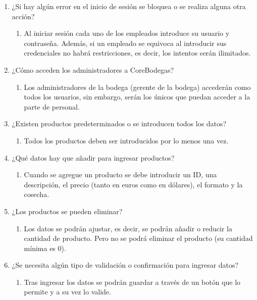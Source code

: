 \begin{enumerate}
    \item ¿Si hay algún error en el inicio de sesión se bloquea o se realiza alguna otra acción?

    \begin{enumerate}
        \item Al iniciar sesión cada uno de los empleados introduce su usuario y
contraseña. Además, si un empleado se equivoca al introducir sus
credenciales no habrá restricciones, es decir, los intentos serán ilimitados.
    \end{enumerate}

    \item ¿Cómo acceden los administradores a CoreBodegas?
    \begin{enumerate}
        \item Los administradores de la bodega (gerente de la bodega) accederán como todos los usuarios, sin embargo, serán los únicos que puedan acceder a la parte de personal.
    \end{enumerate}

    \item ¿Existen productos predeterminados o se introducen todos los datos?
    \begin{enumerate}
        \item Todos los productos deben ser introducidos por lo menos una vez.
    \end{enumerate}

    \item ¿Qué datos hay que añadir para ingresar productos?
    \begin{enumerate}
        \item Cuando se agregue un producto se debe introducir un ID, una descripción, el precio (tanto en euros como en dólares), el formato y la cosecha.
    \end{enumerate}

    \item ¿Los productos se pueden eliminar?
    \begin{enumerate}
        \item Los datos se podrán ajustar, es decir, se podrán añadir o reducir la cantidad de producto. Pero no se podrá eliminar el producto (su cantidad mínima es 0).
    \end{enumerate}

    \item ¿Se necesita algún tipo de validación o confirmación para ingresar datos?
    \begin{enumerate}
        \item Tras ingresar los datos se podrán guardar a través de un botón que lo permite y a su vez lo valide.
    \end{enumerate}


\end{enumerate}
